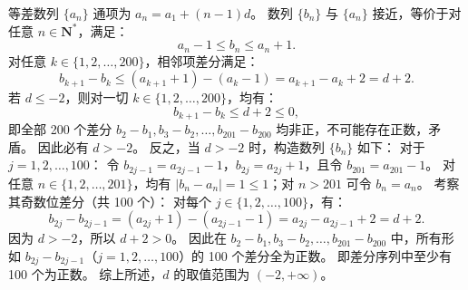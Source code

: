 \begin{answer}
等差数列 $\{a_n\}$ 通项为 $a_n = a_1 + (n - 1)d$。
数列 $\{b_n\}$ 与 $\{a_n\}$ 接近，等价于对任意 $n \in \mathbf{N}^*$，满足：
\nopagebreak[4]
\[a_n - 1 \le b_n \le a_n + 1.\]
对任意 $k \in \{1, 2, \dots, 200\}$，相邻项差分满足：
\nopagebreak[4]
\[b_{k+1} - b_k \le (a_{k+1} + 1) - (a_k - 1) = a_{k+1} - a_k + 2 = d + 2.\]
若 $d \le -2$，则对一切 $k \in \{1, 2, \dots, 200\}$，均有：
\nopagebreak[4]
\[b_{k+1} - b_k \le d + 2 \le 0,\]
即全部 200 个差分 $b_2 - b_1, b_3 - b_2, \dots, b_{201} - b_{200}$ 均非正，不可能存在正数，矛盾。
因此必有 $d > -2$。
反之，当 $d > -2$ 时，构造数列 $\{b_n\}$ 如下：
对于 $j = 1, 2, \dots, 100$：
令 $b_{2j-1} = a_{2j-1} - 1$，$b_{2j} = a_{2j} + 1$，且令 $b_{201} = a_{201} - 1$。
对任意 $n \in \{1, 2, \dots, 201\}$，均有 $|b_n - a_n| = 1 \le 1$；对 $n > 201$ 可令 $b_n = a_n$。
考察其奇数位差分（共 100 个）：
对每个 $j \in \{1, 2, \dots, 100\}$，有：
\nopagebreak[4]
\[b_{2j} - b_{2j-1} = (a_{2j} + 1) - (a_{2j-1} - 1) = a_{2j} - a_{2j-1} + 2 = d + 2.\]
因为 $d > -2$，所以 $d + 2 > 0$。
因此在 $b_2 - b_1, b_3 - b_2, \dots, b_{201} - b_{200}$ 中，所有形如 $b_{2j} - b_{2j-1}$（$j = 1, 2, \dots, 100$）的 100 个差分全为正数。
即差分序列中至少有 100 个为正数。
综上所述，$d$ 的取值范围为 $(-2, +\infty)$。




\end{answer}